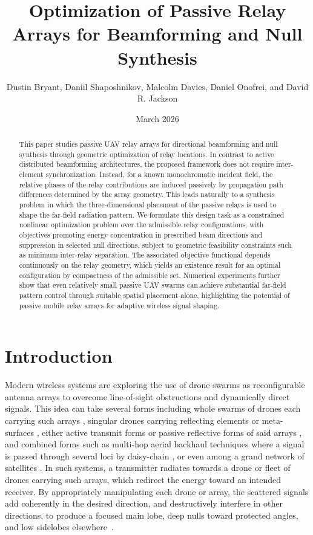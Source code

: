 \documentclass[11pt,letterpaper]{article}
\title{Optimization of Passive Relay Arrays for Beamforming and Null
Synthesis}
\author{Dustin Bryant, Daniil Shaposhnikov, Malcolm Davies, Daniel Onofrei, and David R. Jackson }
\date{March 2026}
\theoremstyle{definition}
\theoremstyle{plain}
\begin{document}
\maketitle

\begin{abstract}
This paper studies passive UAV relay arrays for directional beamforming and null synthesis through geometric optimization of relay locations. In contrast to active distributed beamforming architectures, the proposed framework does not require inter-element synchronization. Instead, for a known monochromatic incident field, the relative phases of the relay contributions are induced passively by propagation path differences determined by the array geometry. This leads naturally to a synthesis problem in which the three-dimensional placement of the passive relays is used to shape the far-field radiation pattern.
We formulate this design task as a constrained nonlinear optimization problem over the admissible relay configurations, with objectives promoting energy concentration in prescribed beam directions and suppression in selected null directions, subject to geometric feasibility constraints such as minimum inter-relay separation. The associated objective functional depends continuously on the relay geometry, which yields an existence result for an optimal configuration by compactness of the admissible set. Numerical experiments further show that even relatively small passive UAV swarms can achieve substantial far-field pattern control through suitable spatial placement alone, highlighting the potential of passive mobile relay arrays for adaptive wireless signal shaping.

\end{abstract}

\section{Introduction}

Modern wireless systems are exploring the use of drone swarms as reconfigurable antenna arrays to overcome line-of-sight obstructions and dynamically direct signals.
This idea can take several forms including whole swarms of drones each carrying such arrays 
\cite{Onofrei2020}
, singular drones carrying reflecting elements or meta-surfaces 
\cite{Shang_Shafinuav_Liu2021, Park2022IRS_UAV_Survey}
, either active transmit forms or passive reflective forms of said arrays
\cite{Alsarayreh2023,Cui2024_CST_Survey}
, and combined forms such as multi-hop aerial backhaul techniques where a signal is passed through several loci by daisy-chain
\cite{Dabiri_Hasna_Khattab_Qaraqe2022}
, or even among a grand network of satellites 
\cite{ImazLueje2020}
.
In such systems, a transmitter radiates towards a drone or fleet of drones carrying such arrays, which redirect the energy toward an intended receiver. By appropriately manipulating each drone or array, the scattered signals add coherently in the desired direction, and destructively interfere in other directions, to produce a focused main lobe, deep nulls toward protected angles, and low sidelobes elsewhere~\cite{Onofrei2020}.
\end{document}
